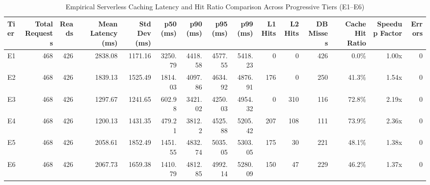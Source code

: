 \begin{table}[t]
\centering
\caption{Empirical Serverless Caching Latency and Hit Ratio Comparison Across Progressive Tiers (E1--E6)}
\label{tab:caching_results}
\begin{tabular}{lrrrrrrrrrrrrrr}
\toprule
Tier & Total Requests & Reads & Mean Latency (ms) & Std Dev (ms) & p50 (ms) & p90 (ms) & p95 (ms) & p99 (ms) & L1 Hits & L2 Hits & DB Misses & Cache Hit Ratio & Speedup Factor & Errors \\
\midrule
E1 & 468 & 426 & 2838.08 & 1171.16 & 3250.79 & 4418.58 & 4577.55 & 5418.23 & 0 & 0 & 426 & 0.0\% & 1.00x & 0 \\
E2 & 468 & 426 & 1839.13 & 1525.49 & 1814.03 & 4097.86 & 4634.92 & 4876.91 & 176 & 0 & 250 & 41.3\% & 1.54x & 0 \\
E3 & 468 & 426 & 1297.67 & 1241.65 & 602.98 & 3421.02 & 4250.03 & 4954.32 & 0 & 310 & 116 & 72.8\% & 2.19x & 0 \\
E4 & 468 & 426 & 1200.13 & 1431.35 & 479.21 & 3812.2 & 4525.88 & 5205.42 & 207 & 108 & 111 & 73.9\% & 2.36x & 0 \\
E5 & 468 & 426 & 2058.61 & 1852.49 & 1451.55 & 4832.74 & 5035.05 & 5303.05 & 175 & 30 & 221 & 48.1\% & 1.38x & 0 \\
E6 & 468 & 426 & 2067.73 & 1659.38 & 1410.79 & 4812.85 & 4992.14 & 5280.09 & 150 & 47 & 229 & 46.2\% & 1.37x & 0 \\
\bottomrule
\end{tabular}
\end{table}
